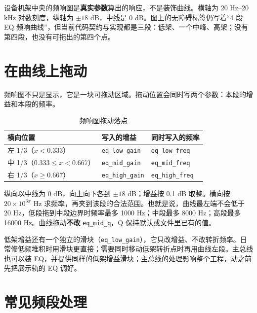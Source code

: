 设备机架中央的频响图是\textbf{真实参数}算出的响应，不是装饰曲线。横轴为 20 Hz–20 kHz 对数刻度，纵轴为 $\pm18$ dB，中线是 0 dB。图上的无障碍标签仍写着“4 段 EQ 频响曲线”，但当前代码契约与实现都是三段：低架、一个中峰、高架；没有第四段，也没有可拖出的第四个点。


\section{在曲线上拖动}

频响图不只是显示，它是一块可拖动区域。拖动位置会同时写两个参数：本段的增益和本段的频率。

\begin{table}[htbp]
\centering
\small
\begin{tabular}{@{}lll@{}}
\hline
横向位置 & 写入的增益 & 同时写入的频率 \\
\hline
左 1/3（$x<0.333$） & \texttt{eq\_low\_gain} & \texttt{eq\_low\_freq} \\
中 1/3（$0.333\le x<0.667$） & \texttt{eq\_mid\_gain} & \texttt{eq\_mid\_freq} \\
右 1/3（$x\ge0.667$） & \texttt{eq\_high\_gain} & \texttt{eq\_high\_freq} \\
\hline
\end{tabular}
\caption{频响图拖动落点}
\label{tab:eq-drag}
\end{table}

纵向以中线为 0 dB，向上向下各到 $\pm18$ dB；增益按 0.1 dB 取整。横向按 $20\times10^{3x}$ Hz 求频率，再夹到该段的合法范围。也就是说，曲线最左端不会低于 20 Hz，低段拖到中段边界时频率最多 1000 Hz；中段最多 8000 Hz；高段最多 16000 Hz。曲线拖动\textbf{不改} \texttt{eq\_mid\_q}，Q 保持默认或文件里已有的值。

低架增益还有一个独立的滑块（\texttt{eq\_low\_gain}），它只改增益、不改转折频率。日常修低频堆积时用滑块更直接；需要同时移动低架转折点时再用曲线左段。主总线也可以装 EQ，并提供同样的低架增益滑块；主总线的处理影响整个工程，动之前先把展示轨的 EQ 调好。

\section{常见频段处理}

